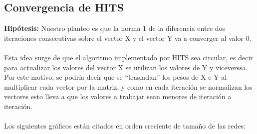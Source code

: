 \documentclass[a4paper]{article}
\begin{document}
\subsection{Convergencia de HITS}

\textbf{Hip\'otesis:} Nuestro planteo es que la norma 1 de la diferencia entre dos iteraciones consecutivas sobre el vector X y el vector Y va a converger al valor 0.\\
\\
\indent Esta idea surge de que el algoritmo implementado por HITS sea circular, es decir para actualizar los valores del vector X se utilizan los valores de Y y viceverssa. Por este motivo, se podr\'ia decir que se ``trasladan'' los pesos de X e Y al multiplicar cada vector por la matriz, y como en cada iteraci\'on se normalizan los vectores esto lleva a que los valores a trabajar sean menores de iteraci\'on a iteraci\'on. \\
\\


Los siguientes gr\'aficos est\'an citados en orden creciente de tama\~no de las redes:\\
\end{document}
